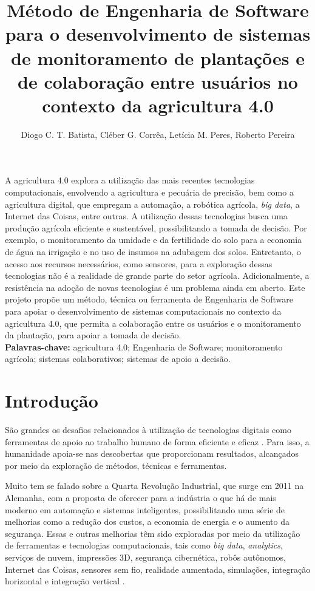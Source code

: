 \documentclass[12pt]{article}
\title{Método de Engenharia de Software para o desenvolvimento de sistemas de monitoramento de plantações e de colaboração entre usuários no contexto da agricultura 4.0}
\author{Diogo C. T. Batista\inst{1}, Cléber G. Corrêa\inst{2}, Letícia M. Peres\inst{1}, Roberto Pereira\inst{1}}
\begin{document}
 

\maketitle
     
\begin{resumo} 
A agricultura 4.0 explora a utilização das mais recentes tecnologias computacionais, envolvendo a agricultura e pecuária de precisão, bem como a agricultura digital, que empregam a automação, a robótica agrícola, \textit{big data}, a Internet das Coisas, entre outras. A utilização dessas tecnologias busca uma produção agrícola eficiente e sustentável, possibilitando a tomada de decisão. Por exemplo, o monitoramento da umidade e da fertilidade do solo para a economia de água na irrigação e no uso de insumos na adubagem dos solos. Entretanto, o acesso aos recursos necessários, como sensores, para a exploração dessas tecnologias não é a realidade de grande parte do setor agrícola. Adicionalmente, a resistência na adoção de novas tecnologias é um problema ainda em aberto. Este projeto propõe um método, técnica ou ferramenta de Engenharia de Software para apoiar o desenvolvimento de sistemas computacionais no contexto da agricultura 4.0, que permita a colaboração entre os usuários e o monitoramento da plantação, para apoiar a tomada de decisão. \\

\textbf{Palavras-chave:} agricultura 4.0; Engenharia de Software; monitoramento agrícola; sistemas colaborativos; sistemas de apoio a decisão.
\end{resumo}

\section{Introdução}
\label{sec:introducao}

São grandes os desafios relacionados à utilização de tecnologias digitais como ferramentas de apoio ao trabalho humano de forma eficiente e eficaz \cite{Rose:2019}. Para isso, a humanidade apoia-se nas descobertas que proporcionam resultados, alcançados por meio da exploração de métodos, técnicas e ferramentas.

Muito tem se falado sobre a Quarta Revolução Industrial, que surge em 2011 na Alemanha, com a proposta de oferecer para a indústria o que há de mais moderno em automação e sistemas inteligentes, possibilitando uma série de melhorias como a redução dos custos, a economia de energia e o aumento da segurança. Essas e outras melhorias têm sido exploradas por meio da utilização de ferramentas e tecnologias computacionais, tais como \textit{big data}, \textit{analytics}, serviços de nuvem, impressões 3D, segurança cibernética, robôs autônomos, Internet das Coisas, sensores sem fio, realidade aumentada, simulações, integração horizontal e integração vertical \cite{Souza:2017}.
\end{document}

